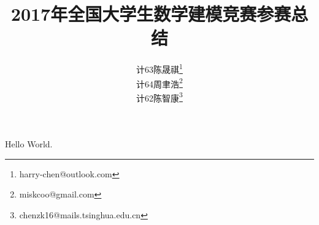 \documentclass[fontset=adobe]{ctexart}
\newcommand{\arttitle}{2017年全国大学生数学建模竞赛参赛总结}
\begin{document}
\title{\bfseries{\arttitle}}
\author{
	计63\hspace{1em}陈晟祺\thanks{harry-chen@outlook.com}\\
    计64\hspace{1em}周聿浩\thanks{miskcoo@gmail.com}\\
    计62\hspace{1em}陈智康\thanks{chenzk16@mails.tsinghua.edu.cn}
}
\date{}
\maketitle

Hello World.
\end{document}
